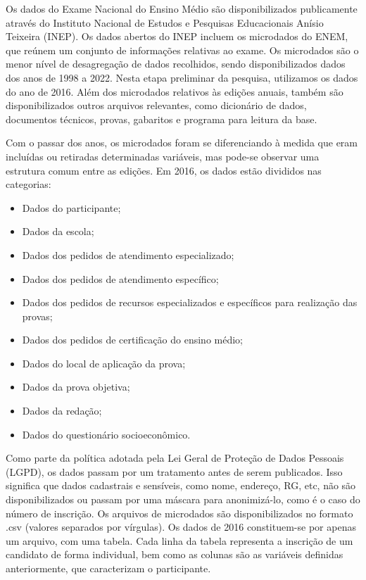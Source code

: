 Os dados do Exame Nacional do Ensino Médio são disponibilizados publicamente através do Instituto Nacional de Estudos e Pesquisas Educacionais Anísio Teixeira (INEP). Os dados abertos do INEP incluem os microdados do ENEM, que reúnem um conjunto de informações relativas ao exame. Os microdados são o menor nível de desagregação de dados recolhidos, sendo disponibilizados dados dos anos de 1998 a 2022. Nesta etapa preliminar da pesquisa, utilizamos os dados do ano de 2016. Além dos microdados relativos às edições anuais, também são disponibilizados outros arquivos relevantes, como dicionário de dados, documentos técnicos, provas, gabaritos e programa para leitura da base.

Com o passar dos anos, os microdados foram se diferenciando à medida que eram incluídas ou retiradas determinadas variáveis, mas pode-se observar uma estrutura comum entre as edições. Em 2016, os dados estão divididos nas categorias:

\begin{itemize}
  \item Dados do participante; 
  \item Dados da escola;
  \item Dados dos pedidos de atendimento especializado;
  \item Dados dos pedidos de atendimento específico;
  \item Dados dos pedidos de recursos especializados e específicos para realização das provas;
  \item Dados dos pedidos de certificação do ensino médio;
  \item Dados do local de aplicação da prova;
  \item Dados da prova objetiva;
  \item Dados da redação;
  \item Dados do questionário socioeconômico.
\end{itemize}

Como parte da política adotada pela Lei Geral de Proteção de Dados Pessoais (LGPD), os dados passam por um tratamento antes de serem publicados. Isso significa que dados cadastrais e sensíveis, como nome, endereço, RG, etc, não são disponibilizados ou passam por uma máscara para anonimizá-lo, como é o caso do número de inscrição. Os arquivos de microdados são disponibilizados no formato .csv (valores separados por vírgulas). Os dados de 2016 constituem-se por apenas um arquivo, com uma tabela. Cada linha da tabela representa a inscrição de um candidato de forma individual, bem como as colunas são as variáveis definidas anteriormente, que caracterizam o participante. 

